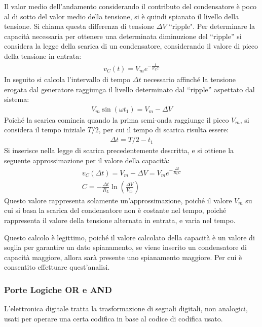 \documentclass{article}
\numberwithin{equation}{subsection}
\begin{document}
Il valor medio dell'andamento considerando il contributo del condensatore è poco al di sotto del valor medio della tensione, si è quindi spianato il livello della tensione. 
Si chiama questa differenza di tensione $\Delta V$ ``ripple". 
Per determinare la capacità necessaria per ottenere una determinata diminuzione del ``ripple'' si considera la legge della scarica di un condensatore, 
considerando il valore di picco della tensione in entrata:
\begin{gather*}
    v_C(t)=V_me^{-\frac{t}{R_LC}}
\end{gather*}
In seguito si calcola l'intervallo di tempo $\Delta t$ necessario affinché la tensione erogata dal generatore raggiunga il livello determinato 
dal ``ripple'' aspettato dal sistema:
\begin{gather*}
    V_m\sin(\omega t_1)=V_m-\Delta V
\end{gather*}
Poiché la scarica comincia quando la prima semi-onda raggiunge il picco $V_m$, si considera il tempo iniziale $T/2$, per cui il tempo di scarica 
risulta essere:
\begin{gather*}
    \Delta t= T/2-t_1
\end{gather*}
Si inserisce nella legge di scarica precedentemente descritta, e si ottiene la seguente approssimazione per il valore della capacità:
\begin{gather*}
    v_C(\Delta t)=V_m-\Delta V=V_me^{-\frac{\Delta t}{R_LC}}\\
    C=-\displaystyle\frac{\Delta t}{R_L}\ln\left(\frac{\Delta V}{V_m}\right)
\end{gather*}
Questo valore rappresenta solamente un'approssimazione, poiché il valore $V_m$ su cui si basa la scarica del condensatore non è costante nel tempo, 
poiché rappresenta il valore della tensione alternata in entrata, e varia nel tempo. 

Questo calcolo è legittimo, poiché il valore calcolato della capacità è un valore di soglia per garantire un dato spianamento, se viene inserito 
un condensatore di capacità maggiore, allora sarà presente uno spianamento maggiore. Per cui è consentito effettuare quest'analisi. 

\subsubsection{Porte Logiche OR e AND}

L'elettronica digitale tratta la trasformazione di segnali digitali, non analogici, usati per operare una certa codifica in base al codice di codifica usato. 
\end{document}
